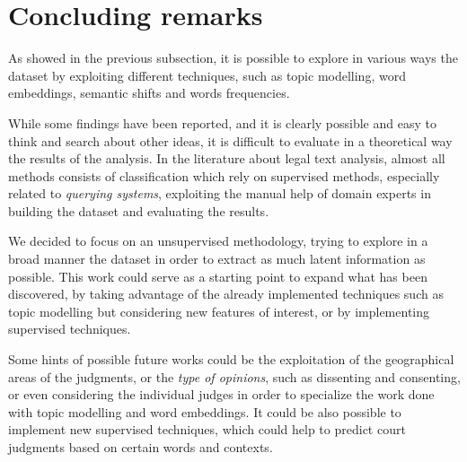 \section{Concluding remarks}
As showed in the previous subsection, it is possible to explore
in various ways the dataset by exploiting different techniques, such as topic modelling, word embeddings, semantic
shifts and words frequencies.

While some findings have been reported, and it is clearly possible and easy to think and search about other ideas,
it is difficult to evaluate in a theoretical way the results of the analysis. In the literature about
legal text analysis, almost all methods consists of classification which rely on supervised methods, 
especially related to \emph{querying systems}, exploiting the manual help of domain experts in building the dataset 
and evaluating the results.~\cite{caselaw_query}

We decided to focus on an unsupervised methodology, trying to explore in a broad manner the dataset in order to
extract as much latent information as possible. This work could serve as a starting point to expand what has been
discovered, by taking advantage of the already implemented techniques such as topic modelling but considering new
features of interest, or by implementing supervised techniques.

Some hints of possible future works could be the exploitation of the geographical areas of the judgments,
or the \emph{type of
opinions}, such as dissenting and consenting, or even considering the individual judges in order to specialize
the work done with topic modelling and word embeddings. It could be also possible to 
implement new supervised techniques,
which could help to predict court judgments based on certain words and contexts.~\cite{argumentation_mining}